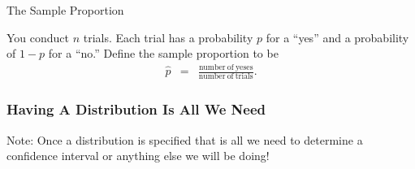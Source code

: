 \begin{frame}{The Sample Proportion}

  You conduct $n$ trials. Each trial has a probability $p$ for a
  ``yes'' and a probability of $1-p$ for a ``no.'' Define the sample
  proportion to be
  \begin{eqnarray*}
    \hat{p} & = & \frac{\mathrm{number~of~yeses}}{\mathrm{number~of~trials}}.
  \end{eqnarray*}



  
\end{frame}

\begin{frame}
  \frametitle{Having A Distribution Is All We Need}

  Note: Once a distribution is specified that is all we need to
  determine a confidence interval or anything else we will be doing!
  
\end{frame}


